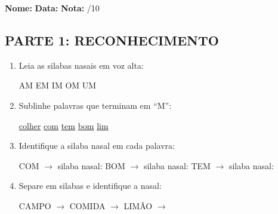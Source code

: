\begin{exercicio}
\noindent\textbf{Nome:} \underline{\hspace{3.2cm}} \quad \textbf{Data:} \underline{\hspace{1.6cm}} \quad \textbf{Nota:} \underline{\hspace{0.9cm}}/10

\subsection*{PARTE 1: RECONHECIMENTO}

\begin{enumerate}
  \item Leia as silabas nasais em voz alta:
  \begin{center}
  AM \quad EM \quad IM \quad OM \quad UM
  \end{center}

  \item Sublinhe palavras que terminam em ``M'':
  \begin{center}
  \uline{colher} \quad \uline{com} \quad \uline{tem} \quad \uline{bom} \quad \uline{lim}
  \end{center}

  \item Identifique a silaba nasal em cada palavra:
  \begin{center}
  COM $\rightarrow$ silaba nasal: \underline{\hspace{1cm}} \quad BOM $\rightarrow$ silaba nasal: \underline{\hspace{1cm}} \quad TEM $\rightarrow$ silaba nasal: \underline{\hspace{1cm}}
  \end{center}

  \item Separe em silabas e identifique a nasal:
  \begin{center}
  CAMPO $\rightarrow$ \underline{\hspace{1cm}} \underline{\hspace{1cm}} \quad COMIDA $\rightarrow$ \underline{\hspace{1cm}} \underline{\hspace{1cm}} \underline{\hspace{1cm}} \quad LIM\~AO $\rightarrow$ \underline{\hspace{1cm}} \underline{\hspace{1cm}}
  \end{center}


\end{enumerate}
\end{exercicio}
